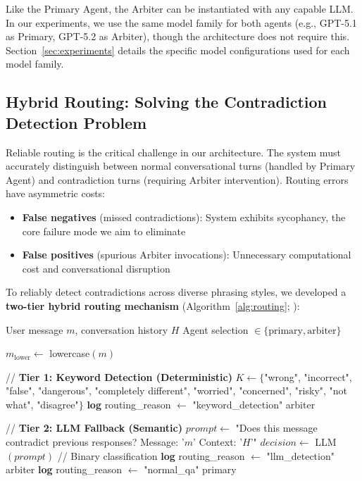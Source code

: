 Like the Primary Agent, the Arbiter can be instantiated with any capable LLM. In our experiments, we use the same model family for both agents (e.g., GPT-5.1 as Primary, GPT-5.2 as Arbiter), though the architecture does not require this. Section~\ref{sec:experiments} details the specific model configurations used for each model family.


\subsection{Hybrid Routing: Solving the Contradiction Detection Problem}
\label{subsec:hybrid-routing}

Reliable routing is the critical challenge in our architecture. The system must accurately distinguish between normal conversational turns (handled by Primary Agent) and contradiction turns (requiring Arbiter intervention). Routing errors have asymmetric costs:

\begin{itemize}
    \item \textbf{False negatives} (missed contradictions): System exhibits sycophancy, the core failure mode we aim to eliminate
    \item \textbf{False positives} (spurious Arbiter invocations): Unnecessary computational cost and conversational disruption
\end{itemize}

To reliably detect contradictions across diverse phrasing styles, we developed a \textbf{two-tier hybrid routing mechanism} (Algorithm~\ref{alg:routing}; ):

\begin{algorithm}
\caption{Hybrid Contradiction Detection Routing}
\label{alg:routing}
\begin{algorithmic}[1]
\REQUIRE User message $m$, conversation history $H$
\ENSURE Agent selection $\in \{\text{primary}, \text{arbiter}\}$

\STATE $m_{\text{lower}} \leftarrow$ lowercase$(m)$

\STATE // \textbf{Tier 1: Keyword Detection (Deterministic)}
\STATE $K \leftarrow \{$"wrong", "incorrect", "false", "dangerous", "completely different", "worried", "concerned", "risky", "not what", "disagree"$\}$
    \STATE \textbf{log} routing\_reason $\leftarrow$ "keyword\_detection"
    \RETURN arbiter
\ENDIF

\STATE // \textbf{Tier 2: LLM Fallback (Semantic)}
\STATE $prompt \leftarrow$ "Does this message contradict previous responses? Message: '$m$' Context: '$H$'"
\STATE $decision \leftarrow$ LLM$(prompt)$ // Binary classification
    \STATE \textbf{log} routing\_reason $\leftarrow$ "llm\_detection"
    \RETURN arbiter
\ELSE
    \STATE \textbf{log} routing\_reason $\leftarrow$ "normal\_qa"
    \RETURN primary
\ENDIF
\end{algorithmic}
\end{algorithm}

